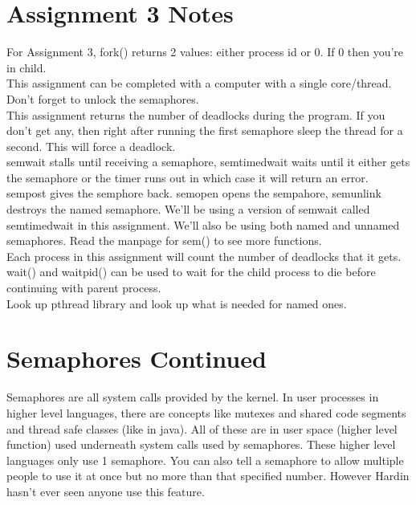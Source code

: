 \documentclass{report}
\begin{document}
\section{Assignment 3 Notes}
For Assignment 3, fork() returns 2 values: either process id or 0. If 0 then you're in child.\\

This assignment can be completed with a computer with a single core/thread.\\

Don't forget to unlock the semaphores.\\

This assignment returns the number of deadlocks during the program. If you don't get any, then right after running the first semaphore sleep the thread for a second. This will force a deadlock.\\

sem\textunderscore wait stalls until receiving a semaphore, sem\textunderscore timedwait waits until it either gets the semaphore or the timer runs out in which case it will return an error. sem\textunderscore post gives the semphore back. sem\textunderscore open opens the sempahore, sem\textunderscore unlink destroys the named semaphore. We'll be using a version of sem\textunderscore wait called sem\textunderscore timedwait in this assignment. We'll also be using both named and unnamed semaphores. Read the manpage for sem() to see more functions.\\

Each process in this assignment will count the number of deadlocks that it gets.\\

wait() and waitpid() can be used to wait for the child process to die before continuing with parent process.\\

Look up pthread library and look up what is needed for named ones.\\

\section{Semaphores Continued}

Semaphores are all system calls provided by the kernel. In user processes in higher level languages, there are concepts like mutexes and shared code segments and thread safe classes (like in java). All of these are in user space (higher level function) used underneath system calls used by semaphores. These higher level languages only use 1 semaphore. You can also tell a semaphore to allow multiple people to use it at once but no more than that specified number. However Hardin hasn't ever seen anyone use this feature.\\
\end{document}
